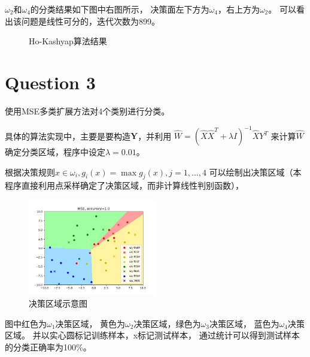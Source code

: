 \documentclass{article}
\newcommand{\question}[1]{\section*{Question #1}}
\begin{document}
$\omega_2$和$\omega_4$的分类结果如下图中右图所示，
决策面左下方为$\omega_4$，右上方为$\omega_2$。
可以看出该问题是线性可分的，迭代次数为899。
\begin{figure}[ht]
	\centering
	\centering
	\caption{Ho-Kashyap算法结果}
	\label{figl}
\end{figure}

\question{3}
使用MSE多类扩展方法对4个类别进行分类。

具体的算法实现中，主要是要构造$\pmb{Y}$，并利用
${\hat W = {(\hat X{\hat X^T} + \lambda I)^{ - 1}}\hat X{Y^T}}$
来计算$\hat W$确定分类区域，程序中设定$\lambda = 0.01$。

根据决策规则$x \in \omega_i, g_i(x) = \max  g_j(x), j = 1, \dots, 4$
可以绘制出决策区域（本程序直接利用点采样确定了决策区域，而非计算线性判别函数），

\begin{figure}[ht]
	\centering
	\includegraphics[width=0.5\textwidth]{Figure_6.png}
	\caption{决策区域示意图}
	\label{figl}
\end{figure}

图中红色为$\omega_1$决策区域，
黄色为$\omega_2$决策区域，绿色为$\omega_3$决策区域，
蓝色为$\omega_4$决策区域。
并以实心圆标记训练样本，x标记测试样本，
通过统计可以得到测试样本的分类正确率为100\%。
\end{document}
